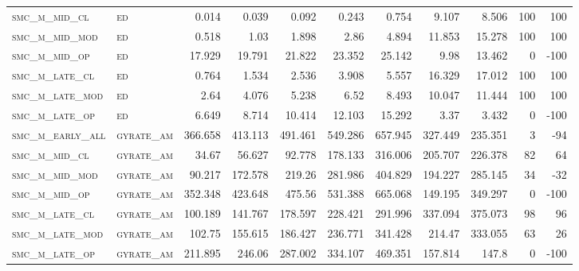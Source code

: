 \begin{landscape}
\begin{center}
\begin{footnotesize}
\begin{longtable}{llrrrrrr|rrr}
\textsc{smc\_m\_mid\_cl   } & \textsc{ed        }   & 0.014    & 0.039    & 0.092    & 0.243    & 0.754    & 9.107       & 8.506         & 100           & 100      \\
\textsc{smc\_m\_mid\_mod  } & \textsc{ed        }   & 0.518    & 1.03     & 1.898    & 2.86     & 4.894    & 11.853      & 15.278        & 100           & 100      \\
\textsc{smc\_m\_mid\_op   } & \textsc{ed        }   & 17.929   & 19.791   & 21.822   & 23.352   & 25.142   & 9.98        & 13.462        & 0             & -100     \\
\textsc{smc\_m\_late\_cl  } & \textsc{ed        }   & 0.764    & 1.534    & 2.536    & 3.908    & 5.557    & 16.329      & 17.012        & 100           & 100      \\
\textsc{smc\_m\_late\_mod } & \textsc{ed        }   & 2.64     & 4.076    & 5.238    & 6.52     & 8.493    & 10.047      & 11.444        & 100           & 100      \\
\textsc{smc\_m\_late\_op  } & \textsc{ed        }   & 6.649    & 8.714    & 10.414   & 12.103   & 15.292   & 3.37        & 3.432         & 0             & -100     \\
\textsc{smc\_m\_early\_all} & \textsc{gyrate\_am}   & 366.658  & 413.113  & 491.461  & 549.286  & 657.945  & 327.449     & 235.351       & 3             & -94      \\
\textsc{smc\_m\_mid\_cl   } & \textsc{gyrate\_am}   & 34.67    & 56.627   & 92.778   & 178.133  & 316.006  & 205.707     & 226.378       & 82            & 64       \\
\textsc{smc\_m\_mid\_mod  } & \textsc{gyrate\_am}   & 90.217   & 172.578  & 219.26   & 281.986  & 404.829  & 194.227     & 285.145       & 34            & -32      \\
\textsc{smc\_m\_mid\_op   } & \textsc{gyrate\_am}   & 352.348  & 423.648  & 475.56   & 531.388  & 665.068  & 149.195     & 349.297       & 0             & -100     \\
\textsc{smc\_m\_late\_cl  } & \textsc{gyrate\_am}   & 100.189  & 141.767  & 178.597  & 228.421  & 291.996  & 337.094     & 375.073       & 98            & 96       \\
\textsc{smc\_m\_late\_mod } & \textsc{gyrate\_am}   & 102.75   & 155.615  & 186.427  & 236.771  & 341.428  & 214.47      & 333.055       & 63            & 26       \\
\textsc{smc\_m\_late\_op  } & \textsc{gyrate\_am}   & 211.895  & 246.06   & 287.002  & 334.107  & 469.351  & 157.814     & 147.8         & 0             & -100     \\

\end{longtable}
\end{footnotesize}
\end{center}
\end{landscape}
